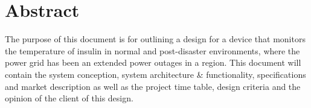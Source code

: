 \section*{Abstract}
The purpose of this document is for outlining a design for a device that monitors the temperature of insulin in normal and post-disaster environments, where the power grid has been an extended power outages in a region. This document will contain the system conception, system architecture \& functionality, specifications and market description as well as the project time table, design criteria and the opinion of the client of this design.
